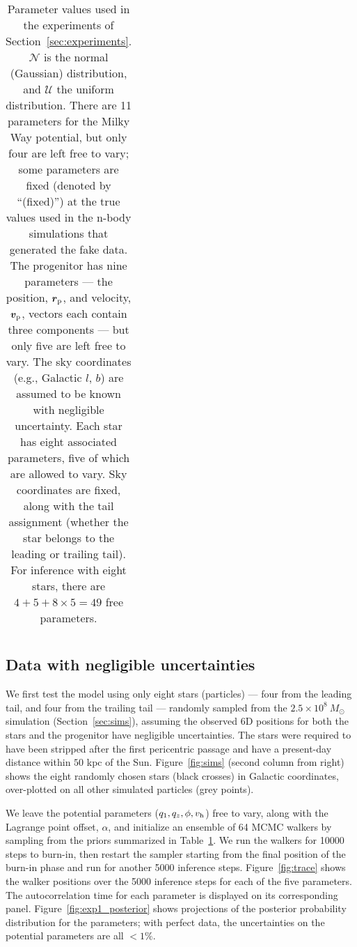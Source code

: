 \documentclass[letterpaper,12pt,preprint]{aastex}
\newcommand{\bs}{\boldsymbol}
\newcommand{\Loffset}{\alpha}
\newcommand{\vhalo}{v_{\rm h}}
\begin{document}
\begin{table}[h]
\begin{center}
\begin{tabular}{l c l}
		\bottomrule
		\end{tabular}
	\caption{Parameter values used in the experiments of Section~\ref{sec:experiments}. $\mathcal{N}$ is the normal (Gaussian) distribution, and $\mathcal{U}$ the uniform distribution. There are 11 parameters for the Milky Way potential, but only four are left free to vary; some parameters are fixed (denoted by ``(fixed)'') at the true values used in the n-body simulations that generated the fake data. The progenitor has nine parameters --- the position, $\bs{r}_{\rm p}$, and velocity, $\bs{v}_{\rm p}$, vectors each contain three components --- but only five are left free to vary. The sky coordinates (e.g., Galactic $l$, $b$) are assumed to be known with negligible uncertainty. Each star has eight associated parameters, five of which are allowed to vary. Sky coordinates are fixed, along with the tail assignment (whether the star belongs to the leading or trailing tail). For inference with eight stars, there are $4+5+8\times5=49$ free parameters. \label{tbl:params}}
\end{center}
\end{table}

\subsection{Data with negligible uncertainties}\label{sec:exp1}

We first test the model using only eight stars (particles) --- four from the leading tail, and four from the trailing tail --- randomly sampled from the $2.5\times10^8~M_\odot$ simulation (Section~\ref{sec:sims}), assuming the observed 6D positions for both the stars and the progenitor have negligible uncertainties. The stars were required to have been stripped after the first pericentric passage and have a present-day distance within $50$ kpc of the Sun. Figure~\ref{fig:sims} (second column from right) shows the eight randomly chosen stars (black crosses) in Galactic coordinates, over-plotted on all other simulated particles (grey points). 

We leave the potential parameters ($q_1,q_z,\phi,\vhalo$) free to vary, along with the Lagrange point offset, $\Loffset$, and initialize an ensemble of 64 MCMC walkers by sampling from the priors summarized in Table~\ref{tbl:params}. We run the walkers for 10000 steps to burn-in, then restart the sampler starting from the final position of the burn-in phase and run for another 5000 inference steps. Figure~\ref{fig:trace} shows the walker positions over the 5000 inference steps for each of the five parameters. The autocorrelation time for each parameter is displayed on its corresponding panel. Figure~\ref{fig:exp1_posterior} shows projections of the posterior probability distribution for the parameters; with perfect data, the uncertainties on the potential parameters are all $<1\%$.
\end{document}
